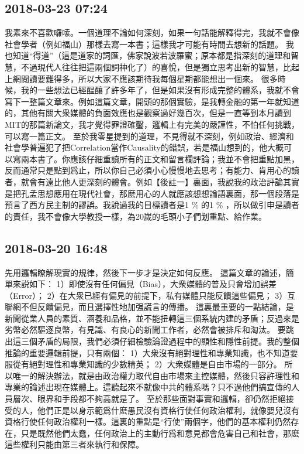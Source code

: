\documentclass[twocolumn]{ctexart}
\begin{document}
\subsection*{2018-03-23 07:24}

我素來不喜歡囉嗦。一個道理不論如何深刻，如果一句話能解釋得完，我就不會像社會學者（例如福山）那樣去寫一本書；這樣我才可能有時間去想新的話題。 
我也知道“得道”（這是道家的詞匯，佛家說波若波羅蜜；原本都是指深刻的道理和智慧，不過現代人往往把這兩個詞神化了）的喜悅，但是獨立思考出新的智慧，比起上網閲讀要難得多，所以大家不應該期待我每個星期都能想出一個來。 
很多時候，我的一些想法已經醖釀了許多年了，但是如果沒有形成完整的體系，我就不會寫下一整篇文章來。例如這篇文章，開頭的那個實驗，是我轉金融的第一年就知道的，其他有關大衆媒體的負面效應也是觀察過好幾百次，但是一直等到本月讀到MIT的那篇新論文，我才覺得罪證確鑿，邏輯上有完美的嚴謹性，不怕任何挑戰，可以寫一篇正文。 
至於我零星提到的道理，不見得就不深刻，例如政治、經濟和社會學普遍犯了把Correlation當作Causality的錯誤，若是福山想到的，他大概可以寫兩本書了。你應該仔細重讀所有的正文和留言欄評論；我並不會把重點加黑，反而通常只是點到爲止，所以你自己必須小心慢慢地去思考；有能力、肯用心的讀者，就會有遠比他人更深刻的體會。例如【後註一】裏面，我說我的政治評論其實是把孔孟思想應用在現代社會，那麽用心的人就應該想想論語裏面，那一個段落是預言了西方民主制的謬誤。我說過我的目標讀者是1 \% 的1 \% ，所以做引申是讀者的責任，我不會像大學教授一樣，為20嵗的毛頭小子們划重點、給作業。
\subsection*{2018-03-20 16:48}

先用邏輯瞭解現實的規律，然後下一步才是決定如何反應。 
這篇文章的論述，簡單來説如下： 
1）即使沒有任何偏見（Bias），大衆媒體的普及只會增加誤差（Error）； 
2）在大衆已經有偏見的前提下，私有媒體只能反饋這些偏見； 
3）互聯網不但反饋偏見，而且選擇性地加强謊言的傳播。 
這裏最重要的一點結論，是新聞從業人員的素質、涵養和品格，並不能扭轉這三個系統内建的矛盾；反過來是劣幣必然驅逐良幣，有見識、有良心的新聞工作者，必然會被排斥和淘汰。 
要跳出這三個矛盾的局限，我們必須仔細檢驗論證過程中的顯性和隱性前提。我的整個推論的重要邏輯前提，只有兩個： 
1）大衆沒有絕對理性和專業知識，也不知道要服從有絕對理性和專業知識的少數精英； 
2）大衆媒體是自由市場的一部分。 
所以唯一的解決辦法，就是由政治權力取代自由市場來主控媒體，然後只容許理性和專業的論述出現在媒體上。這聽起來不就像中共的體系嗎？只不過他們搞宣傳的人員層次、眼界和手段都不夠高就是了。 
至於那些面對事實和邏輯，卻仍然拒絕接受的人，他們正是以身示範爲什麽愚民沒有資格行使任何政治權利，就像嬰兒沒有資格行使任何政治權利一樣。這裏的重點是“行使”兩個字，他們的基本權利仍然存在，只是既然他們太蠢，任何政治上的主動行爲和意見都會危害自己和社會，那麽這些權利只能由第三者來執行和保障。
\end{document}
